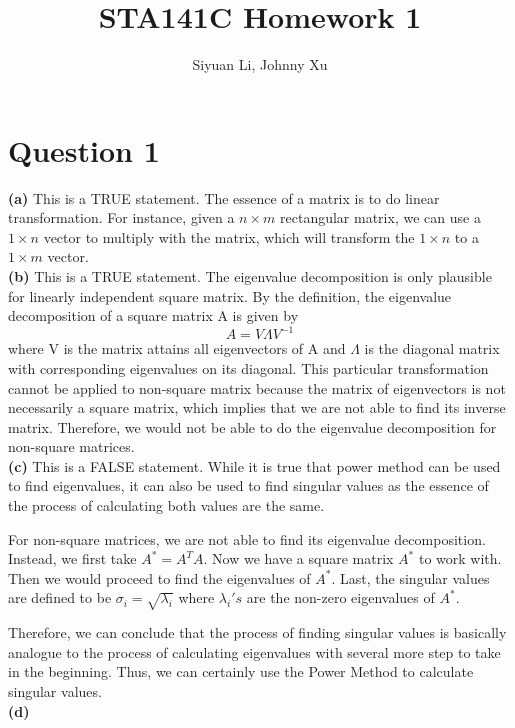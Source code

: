 \documentclass[12pt]{article}
\begin{document}
\title{STA141C Homework 1}
\author{Siyuan Li, Johnny Xu}
\maketitle

\section*{Question 1}
\textbf{(a)}
This is a TRUE statement. The essence of a matrix is to do linear transformation. For instance, given a $n \times m$ rectangular matrix, we can use a $1 \times n$ vector to multiply with the matrix, which will transform the $1 \times n$ to a $1 \times m$ vector. \\
\textbf{(b)}
This is a TRUE statement. The eigenvalue decomposition is only plausible for linearly independent square matrix. By the definition, the eigenvalue decomposition of a square matrix A is given by
$$A = V \Lambda V^{-1}$$
where V is the matrix attains all eigenvectors of A and $\Lambda$ is the diagonal matrix with corresponding eigenvalues on its diagonal. This particular transformation cannot be applied to non-square matrix because the matrix of eigenvectors is not necessarily a square matrix, which implies that we are not able to find its inverse matrix. Therefore, we would not be able to do the eigenvalue decomposition for non-square matrices. \\
\textbf{(c)}
This is a FALSE statement. While it is true that power method can be used to find eigenvalues, it can also be used to find singular values as the essence of the process of calculating both values are the same.

For non-square matrices, we are not able to find its eigenvalue decomposition. Instead, we first take $A^{*} = A^{T}A$. Now we have a square matrix $A^{*}$ to work with. Then we would proceed to find the eigenvalues of $A^{*}$. Last, the singular values are defined to be $\sigma_{i} = \sqrt{\lambda_{i}}$ where $\lambda_{i}'s$ are the non-zero eigenvalues of $A^{*}$. 

Therefore, we can conclude that the process of finding singular values is basically analogue to the process of calculating eigenvalues with several more step to take in the beginning. Thus, we can certainly use the Power Method to calculate singular values. \\
\textbf{(d)}
\end{document}
